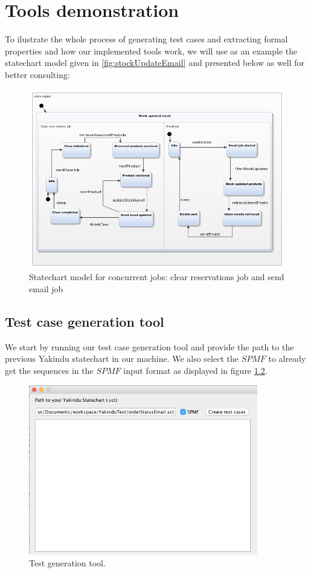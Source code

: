 \chapter{Tools demonstration}
\label{cap:casestudy}

To ilustrate the whole process of generating test cases and extracting formal properties and how our implemented tools work, we will use as an example the statechart model given in \ref{fig:stockUpdateEmail} and presented below as well for better consulting:

\begin{figure}[h]
\centering
\includegraphics[width=15cm]{figuras/stockUpdateEmail}
\caption{\label{fig:stockUpdateEmail_2} Statechart model for concurrent jobs: clear reservations job and send email job}
\end{figure}

\section{Test case generation tool}

We start by running our test case generation tool and provide the path to the previous Yakindu statechart in our machine. We also select the $SPMF$ to already get the sequences in the $SPMF$ input format as displayed in figure \ref{fig:testGenTool_1}.

\begin{figure}[htb]
\centering
\includegraphics[width=10cm]{figuras/testGenTool_1}
\caption{\label{fig:testGenTool_1} Test generation tool.}
\end{figure}

